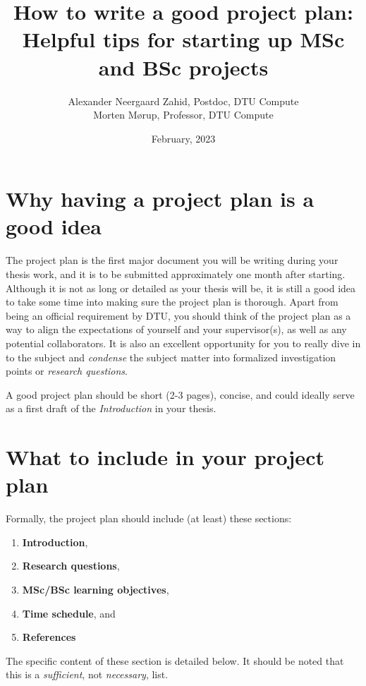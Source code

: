 \documentclass{article}
\title{How to write a good project plan:\\%
       Helpful tips for starting up MSc and BSc projects}
\author{Alexander Neergaard Zahid, Postdoc, DTU Compute\\%
        Morten Mørup, Professor, DTU Compute}
\date{February, 2023}
\begin{document}
\maketitle


\section{Why having a project plan is a good idea}
The project plan is the first major document you will be writing during your thesis work, and it is to be submitted approximately one month after starting. 
Although it is not as long or detailed as your thesis will be, it is still a good idea to take some time into making sure the project plan is thorough.
Apart from being an official requirement by DTU, you should think of the project plan as a way to align the expectations of yourself and your supervisor(s), as well as any potential collaborators.
It is also an excellent opportunity for you to really dive in to the subject and \emph{condense} the subject matter into formalized investigation points or \emph{research questions}.

A good project plan should be short (2-3 pages), concise, and could ideally serve as a first draft of the \emph{Introduction} in your thesis.

\section{What to include in your project plan}
Formally, the project plan should include (at least) these sections:
\begin{enumerate}
    \item \textbf{Introduction},
    \item \textbf{Research questions},
    \item \textbf{MSc/BSc learning objectives},
    \item \textbf{Time schedule}, and
    \item \textbf{References}
\end{enumerate}
The specific content of these section is detailed below.
It should be noted that this is a \textit{sufficient}, not \textit{necessary}, list.
\end{document}
